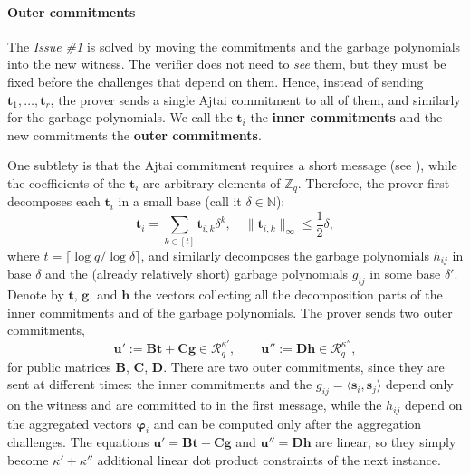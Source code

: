\documentclass[../../book.tex]{subfiles}
\begin{document}
\paragraph{Outer commitments}
The \textit{Issue \#1} is solved by moving the commitments and the garbage polynomials into the new witness.
The verifier does not need to \emph{see} them, but they must be fixed before the challenges that depend on them.
Hence, instead of sending $\mathbf{t}_1, \dots, \mathbf{t}_r$, the prover sends a single Ajtai commitment to all of them, and similarly for the garbage polynomials.
We call the $\mathbf{t}_i$ the \textbf{inner commitments} and the new commitments the \textbf{outer commitments}.

One subtlety is that the Ajtai commitment requires a short message (see ), while the coefficients of the $\mathbf{t}_i$ are arbitrary elements of $\mathbb{Z}_q$.
Therefore, the prover first decomposes each $\mathbf{t}_i$ in a small base (call it $\delta \in \mathbb{N}$):
\begin{equation*}
    \mathbf{t}_i = \sum_{k \in [t]} \mathbf{t}_{i,k}\delta^k, \quad \|\mathbf{t}_{i,k}\|_{\infty} \leq \frac{1}{2}\delta,
\end{equation*}
where $t = \lceil \log q/\log \delta \rceil$, and similarly decomposes the garbage polynomials $h_{ij}$ in base $\delta$ and the (already relatively short) garbage polynomials $g_{ij}$ in some base $\delta'$.
Denote by $\mathbf{t}$, $\mathbf{g}$, and $\mathbf{h}$ the vectors collecting all the decomposition parts of the inner commitments and of the garbage polynomials.
The prover sends two outer commitments,
\begin{equation*}
    \mathbf{u}' := \mathbf{B}\mathbf{t} + \mathbf{C}\mathbf{g} \in \mathcal{R}_q^{\kappa'}, \qquad \mathbf{u}'' := \mathbf{D}\mathbf{h} \in \mathcal{R}_q^{\kappa''},
\end{equation*}
for public matrices $\mathbf{B}$, $\mathbf{C}$, $\mathbf{D}$.
There are two outer commitments, since they are sent at different times: the inner commitments and the $g_{ij} = \langle \mathbf{s}_i, \mathbf{s}_j \rangle$ depend only on the witness and are committed to in the first message, while the $h_{ij}$ depend on the aggregated vectors $\boldsymbol{\varphi}_i$ and can be computed only after the aggregation challenges.
The equations $\mathbf{u}' = \mathbf{B}\mathbf{t} + \mathbf{C}\mathbf{g}$ and $\mathbf{u}'' = \mathbf{D}\mathbf{h}$ are linear, so they simply become $\kappa' + \kappa''$ additional linear dot product constraints of the next instance.
\end{document}

